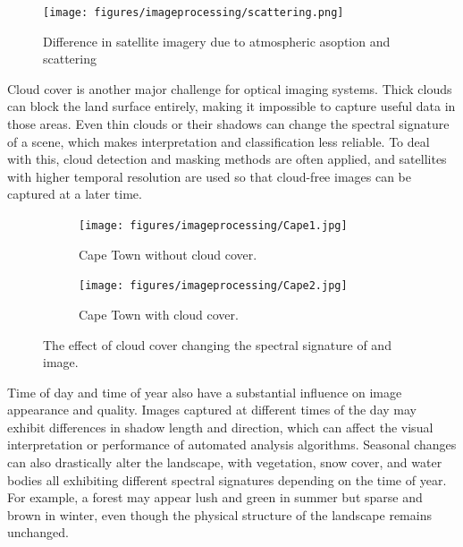 \begin{figure}[H]
    \centering
    \texttt{[image: figures/imageprocessing/scattering.png]}
    \caption{Difference in satellite imagery due to atmospheric asoption and scattering \cite{Atmos, Dove}}
    \label{fig:Atmos}
\end{figure}

\noindent
Cloud cover is another major challenge for optical imaging systems. Thick clouds can block the land surface entirely, making it impossible to capture useful data in 
those areas. Even thin clouds or their shadows can change the spectral signature of a scene, which makes interpretation and classification less reliable. To deal with this, 
cloud detection and masking methods are often applied, and satellites with higher temporal resolution are used so that cloud-free images can be captured at a later time.

\vspace{0.5cm}

\begin{figure}[H]
    \centering
    \begin{subfigure}[b]{0.48\linewidth}
        \centering
        \texttt{[image: figures/imageprocessing/Cape1.jpg]}
        \caption{Cape Town without cloud cover.}
        \label{fig:Cloud1}
    \end{subfigure}
    \hfill
    \begin{subfigure}[b]{0.48\linewidth}
        \centering
        \texttt{[image: figures/imageprocessing/Cape2.jpg]} %
        \caption{Cape Town with cloud cover.}
        \label{fig:Cloud2}
    \end{subfigure}
    \caption{The effect of cloud cover changing the spectral signature of and image.}
    \label{fig:Cloud}
\end{figure}

\noindent
Time of day and time of year also have a substantial influence on image appearance and quality. Images captured at different times of the day may 
exhibit differences in shadow length and direction, which can affect the visual interpretation or performance of automated analysis algorithms. Seasonal changes 
can also drastically alter the landscape, with vegetation, snow cover, and water bodies all exhibiting different spectral signatures depending on the time of year. For example, 
a forest may appear lush and green in summer but sparse and brown in winter, even though the physical structure of the landscape remains unchanged.
\vspace{0.5cm}


